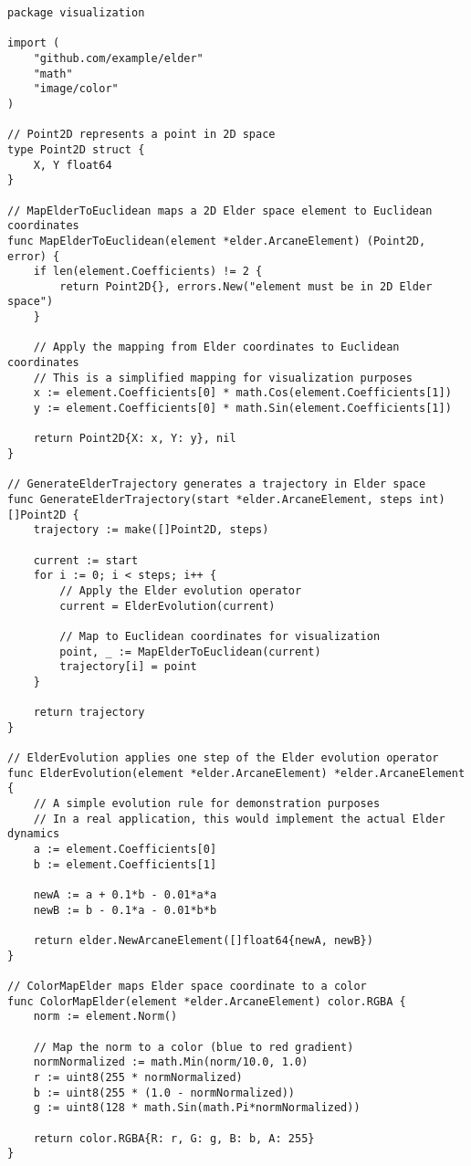 \begin{lstlisting}[language=golang, caption={Elder Space Visualization Utility}]
package visualization

import (
    "github.com/example/elder"
    "math"
    "image/color"
)

// Point2D represents a point in 2D space
type Point2D struct {
    X, Y float64
}

// MapElderToEuclidean maps a 2D Elder space element to Euclidean coordinates
func MapElderToEuclidean(element *elder.ArcaneElement) (Point2D, error) {
    if len(element.Coefficients) != 2 {
        return Point2D{}, errors.New("element must be in 2D Elder space")
    }
    
    // Apply the mapping from Elder coordinates to Euclidean coordinates
    // This is a simplified mapping for visualization purposes
    x := element.Coefficients[0] * math.Cos(element.Coefficients[1])
    y := element.Coefficients[0] * math.Sin(element.Coefficients[1])
    
    return Point2D{X: x, Y: y}, nil
}

// GenerateElderTrajectory generates a trajectory in Elder space
func GenerateElderTrajectory(start *elder.ArcaneElement, steps int) []Point2D {
    trajectory := make([]Point2D, steps)
    
    current := start
    for i := 0; i < steps; i++ {
        // Apply the Elder evolution operator
        current = ElderEvolution(current)
        
        // Map to Euclidean coordinates for visualization
        point, _ := MapElderToEuclidean(current)
        trajectory[i] = point
    }
    
    return trajectory
}

// ElderEvolution applies one step of the Elder evolution operator
func ElderEvolution(element *elder.ArcaneElement) *elder.ArcaneElement {
    // A simple evolution rule for demonstration purposes
    // In a real application, this would implement the actual Elder dynamics
    a := element.Coefficients[0]
    b := element.Coefficients[1]
    
    newA := a + 0.1*b - 0.01*a*a
    newB := b - 0.1*a - 0.01*b*b
    
    return elder.NewArcaneElement([]float64{newA, newB})
}

// ColorMapElder maps Elder space coordinate to a color
func ColorMapElder(element *elder.ArcaneElement) color.RGBA {
    norm := element.Norm()
    
    // Map the norm to a color (blue to red gradient)
    normNormalized := math.Min(norm/10.0, 1.0)
    r := uint8(255 * normNormalized)
    b := uint8(255 * (1.0 - normNormalized))
    g := uint8(128 * math.Sin(math.Pi*normNormalized))
    
    return color.RGBA{R: r, G: g, B: b, A: 255}
}
\end{lstlisting}
